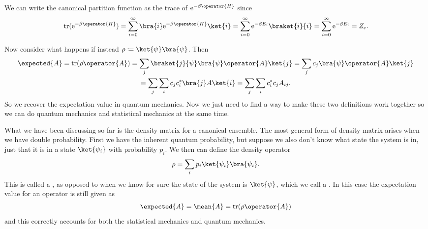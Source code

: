 \documentclass[fleqn]{NotesClass}
\newcommand*{\cpartition}{Z_{\mathrm{c}}}
\newcommand*{\e}{\mathrm{e}}
\DeclareMathOperator{\tr}{tr}
\begin{document}
     We can write the canonical partition function as the trace of \(\e^{-\beta\operator{H}}\) since
    \begin{equation}
        \tr(\e^{-\beta\operator{H}}) = \sum_{i = 0}^{\infty} \bra{i} \e^{-\beta\operator{H}}\ket{i} = \sum_{i = 0}^{\infty} \e^{-\beta E_i} \braket{i}{i} = \sum_{i = 0}^{\infty} \e^{-\beta E_i} = \cpartition.
    \end{equation}
    
    Now consider what happens if instead \(\rho \coloneqq \ket{\psi}\bra{\psi}\).
    Then
    \begin{multline}
        \expected{A} = \tr(\rho\operator{A}) = \sum_j \braket{j}{\psi}\bra{\psi}\operator{A}\ket{j} = \sum_{j} c_j\bra{\psi}\operator{A}\ket{j}\\
        = \sum_j\sum_i c_jc_i^* \bra{j}A\ket{i} = \sum_j\sum_i c_i^*c_j A_{ij}.
    \end{multline}
    So we recover the expectation value in quantum mechanics.
    Now we just need to find a way to make these two definitions work together so we can do quantum mechanics and statistical mechanics at the same time.
    
    What we have been discussing so far is the density matrix for a canonical ensemble.
    The most general form of density matrix arises when we have double probability.
    First we have the inherent quantum probability, but suppose we also don't know what state the system is in, just that it is in a state \(\ket{\psi_i}\) with probability \(p_i\).
    We then can define the density operator
    \begin{equation}
        \rho = \sum_i p_i \ket{\psi_i}\bra{\psi_i}.
    \end{equation}
    This is called a , as opposed to when we know for sure the state of the system is \(\ket{\psi}\), which we call a .
    In this case the expectation value for an operator is still given as
    \begin{equation}
        \expected{A} = \mean{A} = \tr(\rho\operator{A})
    \end{equation}
    and this correctly accounts for both the statistical mechanics and quantum mechanics.
    
\end{document}
